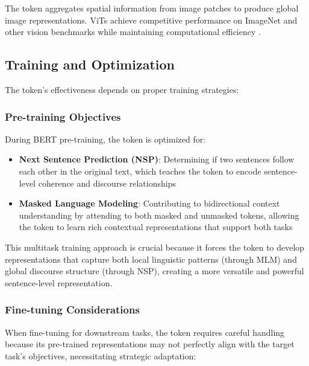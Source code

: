 The \cls{} token aggregates spatial information from image patches to produce global image representations. ViTs achieve competitive performance on ImageNet \citep{russakovsky2015imagenet, deng2009imagenet} and other vision benchmarks while maintaining computational efficiency \citep{strubell2019energy}.

\subsection{Training and Optimization}

The \cls{} token's effectiveness depends on proper training strategies:

\subsubsection{Pre-training Objectives}
During BERT pre-training, the \cls{} token is optimized for:
\begin{itemize}
\item \textbf{Next Sentence Prediction (NSP)}: Determining if two sentences follow each other in the original text, which teaches the \cls{} token to encode sentence-level coherence and discourse relationships
\item \textbf{Masked Language Modeling}: Contributing to bidirectional context understanding by attending to both masked and unmasked tokens, allowing the \cls{} token to learn rich contextual representations that support both tasks
\end{itemize}

This multitask training approach is crucial because it forces the \cls{} token to develop representations that capture both local linguistic patterns (through MLM) and global discourse structure (through NSP), creating a more versatile and powerful sentence-level representation.

\subsubsection{Fine-tuning Considerations}
When fine-tuning for downstream tasks, the \cls{} token requires careful handling because its pre-trained representations may not perfectly align with the target task's objectives, necessitating strategic adaptation:

